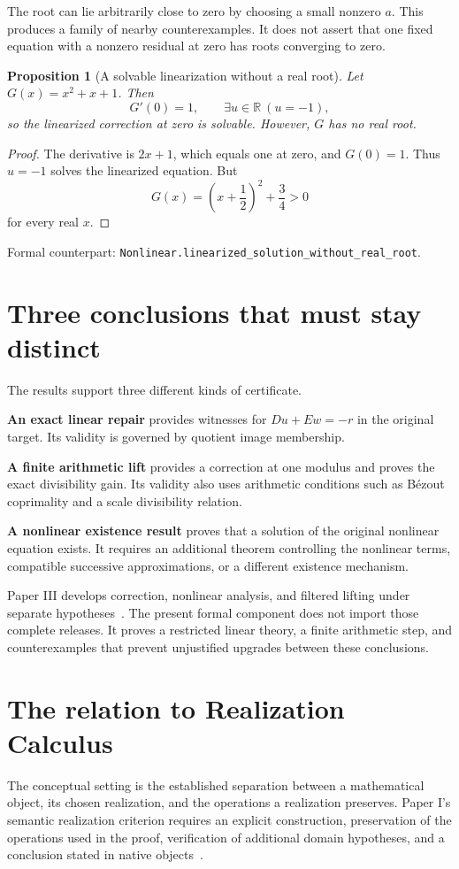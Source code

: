 \documentclass[11pt,letterpaper,oneside,openany]{book}
\theoremstyle{quiet}
\newtheorem{proposition}[theorem]{Proposition}
\newcommand{\R}{\mathbb{R}}
\newcommand{\formal}[1]{\par\nobreak\begingroup\footnotesize\color{Slate}\sffamily Formal counterpart: \normalfont\nolinkurl{#1}.\par\endgroup}
\begin{document}
The root can lie arbitrarily close to zero by choosing a small nonzero $a$. This produces a family of nearby counterexamples. It does not assert that one fixed equation with a nonzero residual at zero has roots converging to zero.

\begin{proposition}[A solvable linearization without a real root]\label{prop:no-real-root}
Let $G(x)=x^2+x+1$. Then
\[
G'(0)=1,\qquad \exists u\in\R\ (u=-1),
\]
so the linearized correction at zero is solvable. However, $G$ has no real root.
\end{proposition}
\begin{proof}
The derivative is $2x+1$, which equals one at zero, and $G(0)=1$. Thus $u=-1$ solves the linearized equation. But
\[
G(x)=\left(x+\frac12\right)^2+\frac34>0
\]
for every real $x$.
\end{proof}
\formal{Nonlinear.linearized_solution_without_real_root}

\section{Three conclusions that must stay distinct}
The results support three different kinds of certificate.

\textbf{An exact linear repair} provides witnesses for $Du+Ew=-r$ in the original target. Its validity is governed by quotient image membership.

\textbf{A finite arithmetic lift} provides a correction at one modulus and proves the exact divisibility gain. Its validity also uses arithmetic conditions such as B\'ezout coprimality and a scale divisibility relation.

\textbf{A nonlinear existence result} proves that a solution of the original nonlinear equation exists. It requires an additional theorem controlling the nonlinear terms, compatible successive approximations, or a different existence mechanism.

Paper III develops correction, nonlinear analysis, and filtered lifting under separate hypotheses~\cite{paperiii}. The present formal component does not import those complete releases. It proves a restricted linear theory, a finite arithmetic step, and counterexamples that prevent unjustified upgrades between these conclusions.

\section{The relation to Realization Calculus}\label{sec:realization}
The conceptual setting is the established separation between a mathematical object, its chosen realization, and the operations a realization preserves. Paper I's semantic realization criterion requires an explicit construction, preservation of the operations used in the proof, verification of additional domain hypotheses, and a conclusion stated in native objects~\cite{paperi}.
\end{document}
